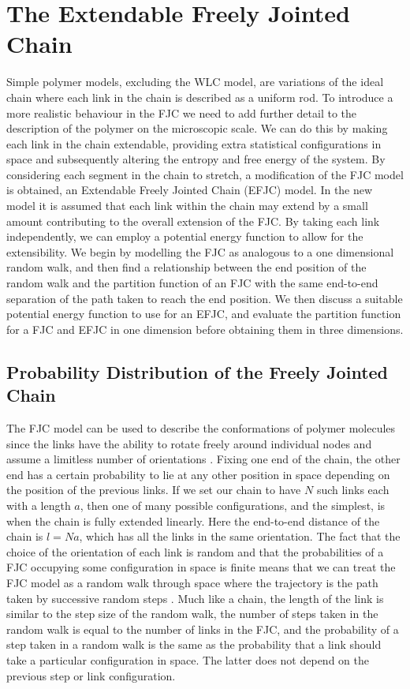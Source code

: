 \chapter{The Extendable Freely Jointed Chain}

Simple polymer models, excluding the WLC model, are variations of the ideal chain where each link in the chain is described as a uniform rod. To introduce a more realistic behaviour in the FJC we need to add further detail to the description of the polymer on the microscopic scale. We can do this by making each link in the chain extendable, providing extra statistical configurations in space and subsequently altering the entropy and free energy of the system. By considering each segment in the chain to stretch, a modification of the FJC model is obtained, an Extendable Freely Jointed Chain (EFJC) model. In the new model it is assumed that each link within the chain may extend by a small amount contributing to the overall extension of the FJC. By taking each link independently, we can employ a potential energy function to allow for the extensibility. 
We begin by modelling the FJC as analogous to a one dimensional random walk, and then find a relationship between the end position of the random walk and the partition function of an FJC with the same end-to-end separation of the path taken to reach the end position. We then discuss a suitable potential energy function to use for an EFJC, and evaluate the partition function for a FJC and EFJC in one dimension before obtaining them in three dimensions.

\section{Probability Distribution of the Freely Jointed Chain}
\label{sec:probability}

The FJC model can be used to describe the conformations of polymer molecules since the links have the ability to rotate freely around individual nodes and assume a limitless number of orientations \cite{Maarel2008}. Fixing one end of the chain, the other end has a certain probability to lie at any other position in space depending on the position of the previous links. If we set our chain to have $N$ such links each with a length $a$, then one of many possible configurations, and the simplest, is when the chain is fully extended linearly. Here the end-to-end distance of the chain is $l=Na$, which has all the links in the same orientation. The fact that the choice of the orientation of each link is random and that the probabilities of a FJC occupying some configuration in space is finite means that we can treat the FJC model as a random walk through space where the trajectory is the path taken by successive random steps \cite{Maarel2008}. Much like a chain, the length of the link is similar to the step size of the random walk, the number of steps taken in the random walk is equal to the number of links in the FJC, and the probability of a step taken in a random walk is the same as the probability that a link should take a particular configuration in space. The latter does not depend on the previous step or link configuration.

